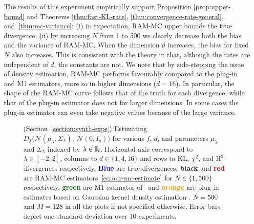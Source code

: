 The results of this experiment empirically support Proposition \ref{prop:upper-bound} and Theorems \ref{thm:fast-KL-rate}, \ref{thm:convergence-rate-general}, and~\ref{thm:mc-variance}:
(i) in expectation, RAM-MC upper bounds the true divergence; (ii) by increasing $N$ from 1 to 500 we clearly decrease both the bias and the variance of RAM-MC.
When the dimension $d$ increases, the bias for fixed $N$ also increases.
This is consistent with the theory in that, although the rates are independent of $d$, the constants are not.
We note that by side-stepping the issue of density estimation, RAM-MC performs favourably compared to the plug-in and M1 estimators, more so in higher dimensions ($d=16$).
In particular, the shape of the RAM-MC curve follows that of the truth for each divergence, while that of the plug-in estimator does not for larger dimensions.
In some cases the plug-in estimator can even take negative values because of the large variance.


\begin{figure}
\begin{center}
\end{center}
\caption{\label{fig:synthetic-exps}
(Section~\ref{section:synth-exps})
Estimating $D_f\bigl(\mathcal{N}(\mu_\lambda, \Sigma_\lambda),\, \mathcal{N}(0, I_d)\bigr)$ for various $f$, $d$, and parameters $\mu_\lambda$ and $\Sigma_\lambda$ indexed by $\lambda\in \mathbb{R}$.
Horizontal axis correspond to $\lambda\in[-2, 2]$,
columns to $d\in\{1, 4, 16\}$ and
rows to KL, $\chi^2$, and $\mathrm{H}^2$ divergences respectively.
{\bf \textcolor{blue}{Blue}} are true divergences, 
{\bf black} and {\bf \textcolor{red}{red}} are RAM-MC estimators~\eqref{eq:our-mc-estimate} for $N\in\{1, 500\}$ respectively,
{\bf \textcolor{darkgreen}{green}} are M1 estimator of~\citep{nguyen10ratio} and {\bf \textcolor{orange}{orange}} are plug-in estimates based on Gaussian kernel density estimation \citep{moon14ensemble}.
$N=500$ and $M=128$ in all the plots if not specified otherwise.
Error bars depict one standard deviation over 10 experiments.
}
\end{figure}

